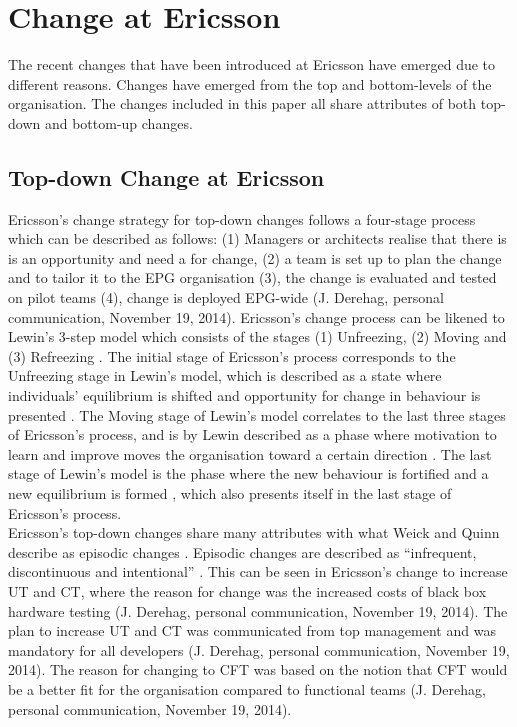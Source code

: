 \documentclass[final_report_innit.tex]{subfiles}
\begin{document}
\section{Change at Ericsson}
The recent changes that have been introduced at Ericsson have emerged due to different reasons. Changes have emerged from the top and bottom-levels of the organisation. The changes included in this paper all share attributes of both top-down and bottom-up changes. 

\subsection{Top-down Change at Ericsson}
Ericsson’s change strategy for top-down changes follows a four-stage process which can be described as follows: (1) Managers or architects realise that there is is an opportunity and need a for change, (2) a team is set up to plan the change and to tailor it to the EPG organisation (3), the change is evaluated and tested on pilot teams (4), change is deployed EPG-wide (J. Derehag, personal communication, November 19, 2014). Ericsson’s change process can be likened to Lewin’s 3-step model which consists of the stages (1) Unfreezing, (2) Moving and (3) Refreezing \cite{burnes2004kurt}. The initial stage of Ericsson’s process corresponds to the Unfreezing stage in Lewin’s model, which is described as a state where individuals’ equilibrium is shifted and opportunity for change in behaviour is presented \cite{burnes2004kurt}. The Moving stage of Lewin’s model correlates to the last three stages of Ericsson's process, and is by Lewin described as a phase where motivation to learn and improve moves the organisation toward a certain direction \cite{burnes2004kurt}. The last stage of Lewin’s model is the phase where the new behaviour is fortified and a new equilibrium is formed \cite{burnes2004kurt}, which also presents itself in the last stage of Ericsson’s process. 
\\

Ericsson’s top-down changes share many attributes with what Weick and Quinn describe as episodic changes \cite{weick1999organizational}. Episodic changes are described as “infrequent, discontinuous and intentional” \cite{weick1999organizational}. This can be seen in Ericsson’s change to increase UT and CT, where the reason for change was the increased costs of black box hardware testing (J. Derehag, personal communication, November 19, 2014). The plan to increase UT and CT was communicated from top management and was mandatory for all developers (J. Derehag, personal communication, November 19, 2014). The reason for changing to CFT was based on the notion that CFT would be a better fit for the organisation compared to functional teams (J. Derehag, personal communication, November 19, 2014). 
\\
\end{document}

